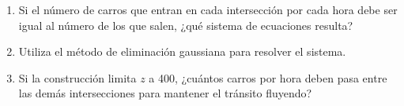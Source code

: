 \documentclass[8pt,a4paper]{article}
\begin{document}
\begin{enumerate}
	\begin{enumerate}
		\item Si el número de carros que entran en cada intersección por cada hora debe ser igual al número de los que salen, ¿qué sistema de ecuaciones resulta?
		\item Utiliza el método de eliminación gaussiana para resolver el sistema.
		\item Si la construcción limita $z$ a 400, ¿cuántos carros por hora deben pasa entre las demás intersecciones para mantener el tránsito fluyendo?
	\end{enumerate}
	
	\end{enumerate}
\end{document}
